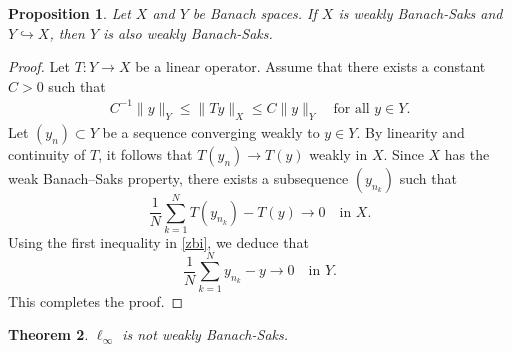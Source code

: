 \documentclass[11pt, reqno]{amsart}
\newtheorem{thm}{Theorem}[section]
\newtheorem{prop}[thm]{Proposition}
\begin{document}
\begin{prop}\label{propemb}
Let \(X\) and \(Y\) be Banach spaces. 
If \(X\) is weakly Banach-Saks and \(Y \hookrightarrow X\), 
then \(Y\) is also weakly Banach-Saks.
\end{prop}
\begin{proof}
Let \(T: Y \to X\) be a linear operator. Assume that there exists a constant \(C>0\) such that
\begin{eqnarray}\label{zbi}
C^{-1}\|y\|_{Y} \le \|Ty\|_{X} \le C\|y\|_{Y}
\quad \text{for all } y \in Y.
\end{eqnarray}
Let \((y_n)\subset Y\) be a sequence converging weakly to \(y \in Y\). By linearity and continuity of \(T\), it follows that 
\(T(y_n) \rightarrow T(y)\) weakly in \(X\).
Since \(X\) has the weak Banach--Saks property, there exists a subsequence 
\((y_{n_k})\) such that
\[
\frac{1}{N}\sum_{k=1}^{N} T(y_{n_k}) - T(y)
\longrightarrow 0
\quad \text{in } X.
\]
Using the first inequality in \eqref{zbi}, we deduce that
\[
\frac{1}{N}\sum_{k=1}^{N} y_{n_k} - y
\longrightarrow 0
\quad \text{in } Y.
\]
This completes the proof.

\end{proof}
\begin{thm}\label{zan}
    $\ell_\infty$ is not weakly Banach-Saks.
\end{thm}
\end{document}
